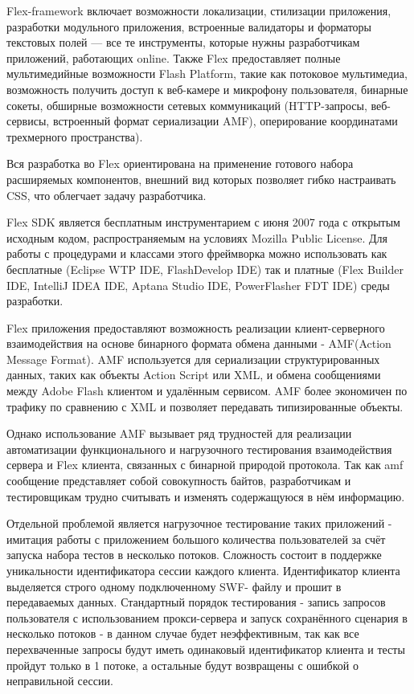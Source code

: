 Flex-framework включает возможности локализации, стилизации приложения, разработки модульного приложения, 
встроенные валидаторы и форматоры текстовых полей — все те инструменты, которые нужны разработчикам 
приложений, работающих online. Также Flex предоставляет полные мультимедийные возможности Flash 
Platform, такие как потоковое мультимедиа,  возможность получить доступ к веб-камере и микрофону 
пользователя, бинарные сокеты, обширные возможности сетевых коммуникаций (HTTP-запросы, веб-сервисы, 
встроенный формат сериализации AMF), оперирование координатами трехмерного пространства).

Вся разработка во Flex  ориентирована на применение готового набора
расширяемых компонентов,  внешний вид которых позволяет гибко
настраивать CSS, что облегчает задачу разработчика. 

Flex SDK  является бесплатным инструментарием с июня 2007 
года с открытым исходным кодом,  распространяемым на условиях Mozilla Public License.  
Для работы с процедурами и классами этого фреймворка можно использовать как бесплатные 
(Eclipse WTP IDE, FlashDevelop IDE) так и платные (Flex Builder IDE, IntelliJ IDEA IDE, 
Aptana Studio IDE, PowerFlasher FDT IDE) среды разработки.

Flex приложения предоставляют возможность реализации клиент-серверного взаимодействия 
на основе бинарного формата обмена данными - AMF(Action Message Format). AMF 
используется для сериализации структурированных данных, таких как объекты Action Script 
или XML, и обмена сообщениями между Adobe Flash клиентом и удалённым сервисом. 
AMF более экономичен по трафику по сравнению с XML и позволяет передавать типизированные объекты.

Однако использование AMF вызывает ряд трудностей для реализации автоматизации функционального 
и нагрузочного тестирования взаимодействия сервера и Flex клиента, связанных с бинарной 
природой протокола. Так как amf сообщение представляет собой совокупность байтов, 
разработчикам и тестировщикам трудно считывать и изменять содержащуюся в нём информацию.

Отдельной проблемой является нагрузочное тестирование таких приложений - имитация работы с 
приложением большого количества пользователей за счёт запуска набора тестов в несколько потоков. 
Сложность состоит в поддержке уникальности идентификатора сессии каждого клиента. Идентификатор 
клиента выделяется строго одному подключенному SWF- файлу и прошит в передаваемых данных. 
Стандартный порядок тестирования - запись запросов пользователя с использованием прокси-сервера 
и запуск сохранённого сценария в несколько потоков - в данном случае будет неэффективным, так 
как  все перехваченные запросы будут иметь одинаковый идентификатор клиента и тесты пройдут 
только в 1 потоке, а остальные будут возвращены с ошибкой о неправильной сессии.
 
